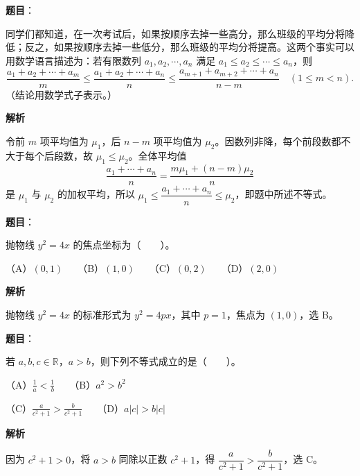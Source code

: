 \begin{answer}

\textbf{题目}：

同学们都知道，在一次考试后，如果按顺序去掉一些高分，那么班级的平均分将降低；反之，如果按顺序去掉一些低分，那么班级的平均分将提高。这两个事实可以用数学语言描述为：若有限数列 $a_1,a_2,\cdots,a_n$ 满足 $a_1\leq a_2\leq\cdots\leq a_n$，则
\nopagebreak[4]
\[
\frac{a_1+a_2+\cdots+a_m}{m}\leq\frac{a_1+a_2+\cdots+a_n}{n}\leq\frac{a_{m+1}+a_{m+2}+\cdots+a_n}{n-m}\quad(1\leq m<n).
\]
（结论用数学式子表示。）

\textbf{解析}

令前 $m$ 项平均值为 $\mu_1$，后 $n-m$ 项平均值为 $\mu_2$。因数列非降，每个前段数都不大于每个后段数，故 $\mu_1\leq\mu_2$。全体平均值
\nopagebreak[4]
\[
\frac{a_1+\cdots+a_n}{n}=\frac{m\mu_1+(n-m)\mu_2}{n}
\]
是 $\mu_1$ 与 $\mu_2$ 的加权平均，所以 $\mu_1\leq\dfrac{a_1+\cdots+a_n}{n}\leq\mu_2$，即题中所述不等式。


\end{answer}
\begin{answer}

\textbf{题目}：

抛物线 $y^2=4x$ 的焦点坐标为\mbox{（　　）}。

（A）$(0,1)$　　（B）$(1,0)$　　（C）$(0,2)$　　（D）$(2,0)$

\textbf{解析}

抛物线 $y^2=4x$ 的标准形式为 $y^2=4px$，其中 $p=1$，焦点为 $(1,0)$，选 B。


\end{answer}
\begin{answer}

\textbf{题目}：

若 $a,b,c\in\mathbb R$，$a>b$，则下列不等式成立的是\mbox{（　　）}。

（A）$\displaystyle\frac1a<\frac1b$　　（B）$a^2>b^2$

（C）$\displaystyle\frac{a}{c^2+1}>\frac{b}{c^2+1}$　　（D）$a|c|>b|c|$

\textbf{解析}

因为 $c^2+1>0$，将 $a>b$ 同除以正数 $c^2+1$，得 $\dfrac{a}{c^2+1}>\dfrac{b}{c^2+1}$，选 C。


\end{answer}
